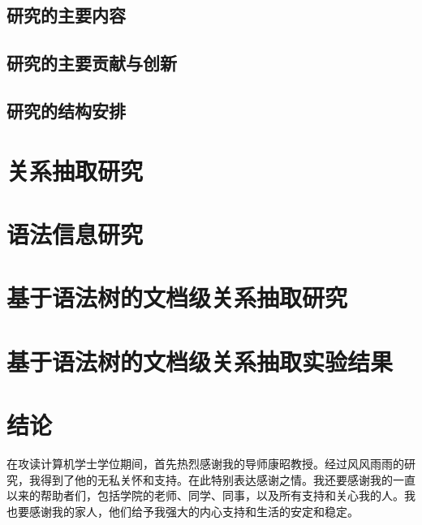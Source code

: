 \documentclass[bachelor]{thesis-uestc}
\begin{document}
\section{研究的主要内容}

\section{研究的主要贡献与创新}

\section{研究的结构安排}

\chapter{关系抽取研究}

\newpage

\chapter{语法信息研究}
\newpage
\chapter{基于语法树的文档级关系抽取研究}
\newpage
\chapter{基于语法树的文档级关系抽取实验结果}
\newpage
\chapter{结论}
\thesisacknowledgement
在攻读计算机学士学位期间，首先热烈感谢我的导师康昭教授。经过风风雨雨的研究，我得到了他的无私关怀和支持。在此特别表达感谢之情。我还要感谢我的一直以来的帮助者们，包括学院的老师、同学、同事，以及所有支持和关心我的人。我也要感谢我的家人，他们给予我强大的内心支持和生活的安定和稳定。

\thesisappendix




%
%

%
%



\end{document}
